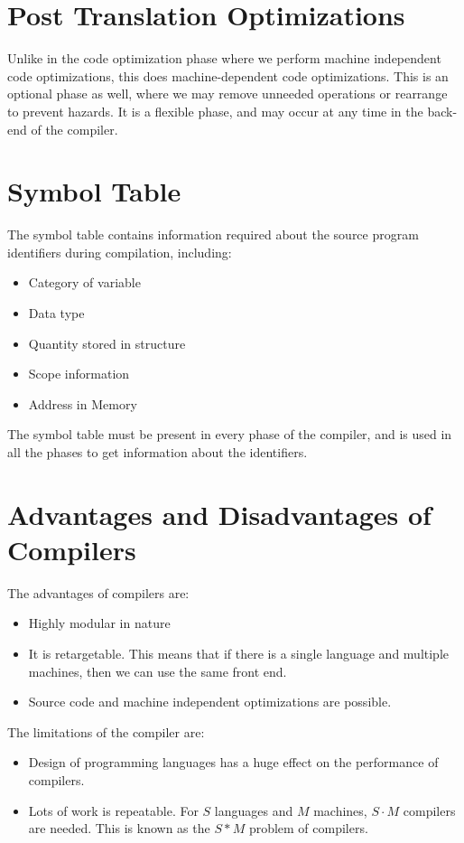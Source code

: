 \documentclass[12pt,letterpaper]{book}
\theoremstyle{definition}
\begin{document}
\section{Post Translation Optimizations}

Unlike in the code optimization phase where we perform machine independent code optimizations, this does machine-dependent code optimizations. This is an optional phase as well, where we may remove unneeded operations or rearrange to prevent hazards. It is a flexible phase, and may occur at any time in the back-end of the compiler.

\section{Symbol Table}

The symbol table contains information required about the source program identifiers during compilation, including:

\begin{itemize}
  \item Category of variable
  \item Data type
  \item Quantity stored in structure
  \item Scope information
  \item Address in Memory
\end{itemize}

The symbol table must be present in every phase of the compiler, and is used in all the phases to get information about the identifiers.

\section{Advantages and Disadvantages of Compilers}

The advantages of compilers are:

\begin{itemize}
  \item Highly modular in nature
  \item It is retargetable. This means that if there is a single language and multiple machines, then we can use the same front end.
  \item Source code and machine independent optimizations are possible.
\end{itemize}

The limitations of the compiler are:

\begin{itemize}
  \item Design of programming languages has a huge effect on the performance of compilers.
  \item Lots of work is repeatable. For $S$ languages and $M$ machines, $S\cdot M$ compilers are needed. This is known as the $S*M$ problem of compilers.
\end{itemize}
\end{document}

